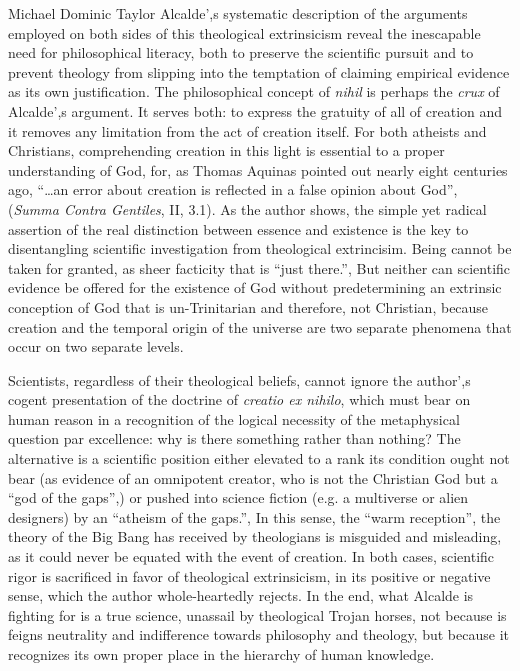 \begin{recengenv}{Michael Dominic Taylor}
Alcalde',s systematic description of the arguments employed on both sides of this theological extrinsicism reveal the inescapable need for philosophical literacy, both to preserve the scientific pursuit and to prevent theology from slipping into the temptation of claiming empirical evidence as its own justification. The philosophical concept of \textit{nihil} is perhaps the \textit{crux} of Alcalde',s argument. It serves both: to express the gratuity of all of creation and it removes any limitation from the act of creation itself. For both atheists and Christians, comprehending creation in this light is essential to a proper understanding of God, for, as Thomas Aquinas pointed out nearly eight centuries ago, “…an error about creation is reflected in a false opinion about God'', (\textit{Summa Contra Gentiles}, II, 3.1). As the author shows, the simple yet radical assertion of the real distinction between essence and existence is the key to disentangling scientific investigation from theological extrincisim. Being cannot be taken for granted, as sheer facticity that is “just there.'', But neither can scientific evidence be offered for the existence of God without predetermining an extrinsic conception of God that is un-Trinitarian and therefore, not Christian, because creation and the temporal origin of the universe are two separate phenomena that occur on two separate levels.

Scientists, regardless of their theological beliefs, cannot ignore the author',s cogent presentation of the doctrine of \textit{creatio ex nihilo}, which must bear on human reason in a recognition of the logical necessity of the metaphysical question par excellence: why is there something rather than nothing? The alternative is a scientific position either elevated to a rank its condition ought not bear (as evidence of an omnipotent creator, who is not the Christian God but a “god of the gaps'',) or pushed into science fiction (e.g. a multiverse or alien designers) by an “atheism of the gaps.'', In this sense, the “warm reception'', the theory of the Big Bang has received by theologians is misguided and misleading, as it could never be equated with the event of creation. In both cases, scientific rigor is sacrificed in favor of theological extrinsicism, in its positive or negative sense, which the author whole-heartedly rejects. In the end, what Alcalde is fighting for is a true science, unassail by theological Trojan horses, not because is feigns neutrality and indifference towards philosophy and theology, but because it recognizes its own proper place in the hierarchy of human knowledge.




\end{recengenv}